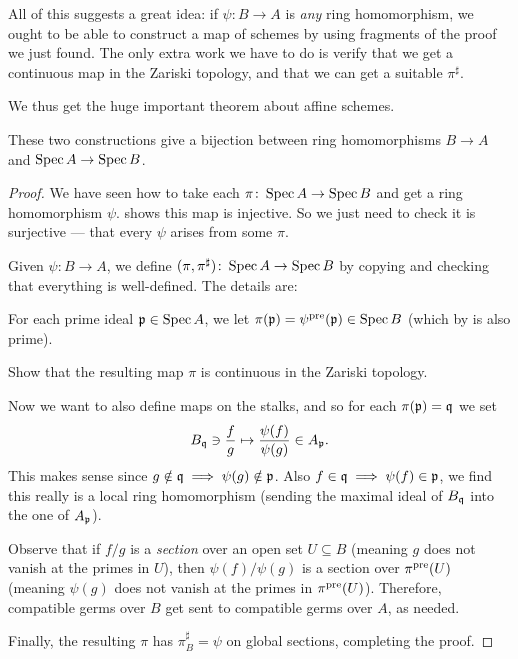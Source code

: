 All of this suggests a great idea:
if $\psi \colon B \to A$ is \emph{any} ring homomorphism,
we ought to be able to construct a map of schemes
by using fragments of the proof we just found.
The only extra work we have to do is verify that
we get a continuous map in the Zariski topology,
and that we can get a suitable $\pi^\sharp$.

We thus get the huge important theorem about affine schemes.
\begin{theorem}
	These two constructions give a bijection between
	ring homomorphisms $B \to A$ and $\operatorname{Spec} A \to \operatorname{Spec} B$.
\end{theorem}
\begin{proof}
	We have seen how to take each
	$\pi \colon \operatorname{Spec} A \to \operatorname{Spec} B$
	and get a ring homomorphism $\psi$.
	 shows this map is injective.
	So we just need to check it is surjective --- that
	every $\psi$ arises from some $\pi$.

	Given $\psi \colon B \to A$, we define
	$(\pi, \pi^\sharp) \colon \operatorname{Spec} A \to \operatorname{Spec} B$
	by copying 
	and checking that everything is well-defined.
	The details are:
	\begin{itemize}
	\ii For each prime ideal $\mathfrak p \in \operatorname{Spec} A$,
	we let $\pi(\mathfrak p) = \psi^{\text{pre}}(\mathfrak p) \in \operatorname{Spec} B$
	(which by  is also prime).
	\begin{exercise}
		Show that the resulting map $\pi$ is continuous
		in the Zariski topology.
	\end{exercise}
	\ii Now we want to also define maps on the stalks,
	and so for each $\pi(\mathfrak p) = \mathfrak q$ we set
	\[ B_\mathfrak q \ni \frac fg \mapsto \frac{\psi(f)}{\psi(g)} \in A_\mathfrak p. \]
	This makes sense since $g \notin \mathfrak q \implies \psi(g) \notin \mathfrak p$.
	Also $f \in \mathfrak q \implies \psi(f) \in \mathfrak p$,
	we find this really is a local ring homomorphism
	(sending the maximal ideal of $B_\mathfrak q$ into the one of $A_\mathfrak p$).

	Observe that if $f/g$ is a \emph{section}
	over an open set $U \subseteq B$
	(meaning $g$ does not vanish at the primes in $U$),
	then $\psi(f)/\psi(g)$ is a section over $\pi^{\text{pre}}(U)$
	(meaning $\psi(g)$ does not vanish at the primes in $\pi^{\text{pre}}(U)$).
	Therefore, compatible germs over $B$
	get sent to compatible germs over $A$, as needed.
	\end{itemize}
	Finally, the resulting $\pi$ has $\pi^\sharp_B = \psi$ on global sections,
	completing the proof.
\end{proof}

